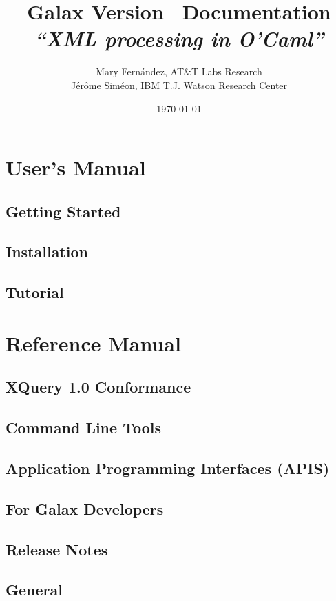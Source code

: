 \documentclass{book}[11pt]
\title{\Large\bf {\LARGE Galax Version
\version\ Documentation}\\[0.5cm] \textit{``XML processing in O'Caml''}}
\author{Mary Fern\'andez, AT\&T Labs Research \\ J\'er\^ome Sim\'eon, IBM T.J. Watson Research Center}
\date{\today}
\newcommand{\eat}[1]{}
\begin{document}
\maketitle
\tableofcontents

\part{User's Manual}
\chapter{Getting Started}
\label{sec:readme}


\chapter{Installation}
\label{sec:install}


\chapter{Tutorial}
\label{sec:tutorial}


\part{Reference Manual}

\chapter{XQuery 1.0 Conformance}
\label{sec:alignment}


\chapter{Command Line Tools}
\label{sec:commandline}


\chapter{Application Programming Interfaces (APIS)}
\label{sec:api}


\eat{
\chapter{Accessing and Storing XML}
\label{sec:documents}
\cutname{documents.html}

}

\chapter{For Galax Developers}
\label{sec:developers}


\chapter{Release Notes}
\label{sec:releasenotes}


\chapter{General}
\label{sec:general}

\end{document}
